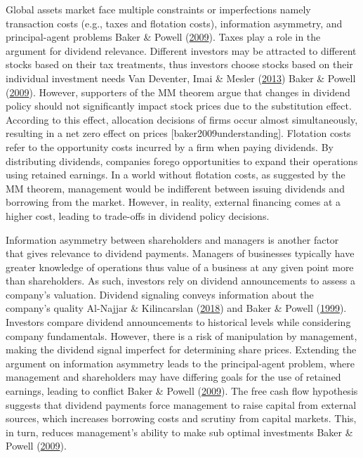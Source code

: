 \documentclass[11pt,preprint, authoryear]{elsarticle}
\numberwithin{equation}{section}
\numberwithin{figure}{section}
\numberwithin{table}{section}
\begin{document}
Global assets market face multiple constraints or imperfections namely
transaction costs (e.g., taxes and flotation costs), information
asymmetry, and principal-agent problems Baker \& Powell
(\protect\hyperlink{ref-baker2009understanding}{2009}). Taxes play a
role in the argument for dividend relevance. Different investors may be
attracted to different stocks based on their tax treatments, thus
investors choose stocks based on their individual investment needs Van
Deventer, Imai \& Mesler (\protect\hyperlink{ref-van2013advanced}{2013})
Baker \& Powell (\protect\hyperlink{ref-baker2009understanding}{2009}).
However, supporters of the MM theorem argue that changes in dividend
policy should not significantly impact stock prices due to the
substitution effect. According to this effect, allocation decisions of
firms occur almost simultaneously, resulting in a net zero effect on
prices {[}baker2009understanding{]}. Flotation costs refer to the
opportunity costs incurred by a firm when paying dividends. By
distributing dividends, companies forego opportunities to expand their
operations using retained earnings. In a world without flotation costs,
as suggested by the MM theorem, management would be indifferent between
issuing dividends and borrowing from the market. However, in reality,
external financing comes at a higher cost, leading to trade-offs in
dividend policy decisions.

Information asymmetry between shareholders and managers is another
factor that gives relevance to dividend payments. Managers of businesses
typically have greater knowledge of operations thus value of a business
at any given point more than shareholders. As such, investors rely on
dividend announcements to assess a company's valuation. Dividend
signaling conveys information about the company's quality Al-Najjar \&
Kilincarslan (\protect\hyperlink{ref-al2018revisiting}{2018}) and Baker
\& Powell (\protect\hyperlink{ref-baker1999corporate}{1999}). Investors
compare dividend announcements to historical levels while considering
company fundamentals. However, there is a risk of manipulation by
management, making the dividend signal imperfect for determining share
prices. Extending the argument on information asymmetry leads to the
principal-agent problem, where management and shareholders may have
differing goals for the use of retained earnings, leading to conflict
Baker \& Powell (\protect\hyperlink{ref-baker2009understanding}{2009}).
The free cash flow hypothesis suggests that dividend payments force
management to raise capital from external sources, which increases
borrowing costs and scrutiny from capital markets. This, in turn,
reduces management's ability to make sub optimal investments Baker \&
Powell (\protect\hyperlink{ref-baker2009understanding}{2009}).
\end{document}
